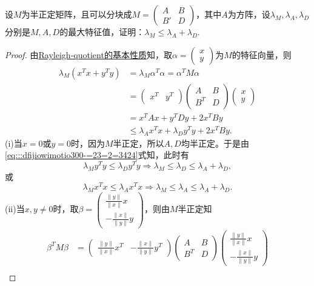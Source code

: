 \documentclass[../../main.tex]{subfiles}
\begin{document}
\begin{example}
设$M$为半正定矩阵，且可以分块成$M=\begin{pmatrix} A & B \\ B' & D \end{pmatrix}$，其中$A$为方阵，设$\lambda_M,\lambda_A,\lambda_D$分别是$M,A,D$的最大特征值，证明：$\lambda_M \leq \lambda_A + \lambda_D$.
\end{example}
\begin{proof}
由\hyperref[proposition:Rayleigh-quotient瑞丽商的基本性质]{Rayleigh-quotient的基本性质}知，取$\alpha =\begin{pmatrix} x \\ y \end{pmatrix}$为$M$的特征向量，则
\begin{align}
\lambda_M (x^T x + y^T y) &= \lambda_M \alpha^T \alpha = \alpha^T M \alpha \nonumber \\
&= \begin{pmatrix} x^T & y^T \end{pmatrix} \begin{pmatrix} A & B \\ B^T & D \end{pmatrix} \begin{pmatrix} x \\ y \end{pmatrix} \nonumber \\
&= x^T A x + y^T D y + 2x^T B y \nonumber \\
&\leq \lambda_A x^T x + \lambda_D y^T y + 2x^T B y. \label{eq:::dfijiowimotio300-=23=2=3424}
\end{align}
(i)当$x=0$或$y=0$时，因为$M$半正定，所以$A,D$均半正定。于是由\eqref{eq:::dfijiowimotio300-=23=2=3424}式知，此时有
$$\lambda_M y^T y \leq \lambda_D y^T y \Longrightarrow \lambda_M \leq \lambda_D \leq \lambda_A + \lambda_D,$$
或
$$\lambda_M x^T x \leq \lambda_A x^T x \Longrightarrow \lambda_M \leq \lambda_A \leq \lambda_A + \lambda_D.$$
(ii)当$x,y \neq 0$时，取$\beta = \begin{pmatrix} \frac{\| y \|}{\| x \|}x \\ -\frac{\| x \|}{\| y \|}y \end{pmatrix}$，则由$M$半正定知
\begin{align*}
\beta^T M \beta &= \begin{pmatrix} \frac{\| y \|}{\| x \|}x^T & -\frac{\| x \|}{\| y \|}y^T \end{pmatrix} \begin{pmatrix} A & B \\ B^T & D \end{pmatrix} \begin{pmatrix} \frac{\| y \|}{\| x \|}x \\ -\frac{\| x \|}{\| y \|}y \end{pmatrix} \\

\end{align*}
\end{proof}
\end{document}
